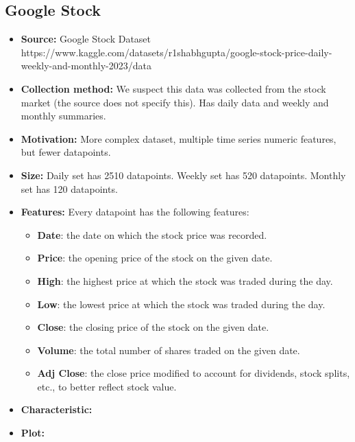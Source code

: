 \subsection{Google Stock}
\begin{itemize}
	\item \textbf{Source:} Google Stock Dataset \\ https://www.kaggle.com/datasets/r1shabhgupta/google-stock-price-daily-weekly-and-monthly-2023/data
	\item \textbf{Collection method:} We suspect this data was collected from the stock market (the source does not specify this). Has daily data and weekly and monthly summaries.
	\item \textbf{Motivation:} More complex dataset, multiple time series numeric features, but fewer datapoints.
	\item \textbf{Size:} Daily set has 2510 datapoints. Weekly set has 520 datapoints. Monthly set has 120 datapoints.
	\item \textbf{Features:} Every datapoint has the following features:
	      \begin{itemize}
		      \item \textbf{Date}: the date on which the stock price was recorded.
		      \item \textbf{Price}: the opening price of the stock on the given date.
		      \item \textbf{High}: the highest price at which the stock was traded during the day.
		      \item \textbf{Low}: the lowest price at which the stock was traded during the day.
		      \item \textbf{Close}: the closing price of the stock on the given date.
		      \item \textbf{Volume}: the total number of shares traded on the given date.
		      \item \textbf{Adj Close}: the close price modified to account for dividends, stock splits, etc., to better reflect stock value.
	      \end{itemize}
	\item \textbf{Characteristic:}
	\item \textbf{Plot:}
\end{itemize}

